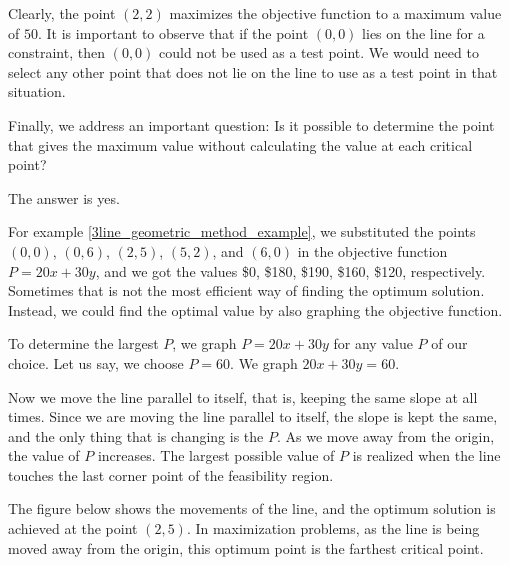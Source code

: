 \begin{solution}
    Clearly, the point $(2, 2)$ maximizes the objective function to a maximum value of $50$. It is important to observe that if the point $(0,0)$ lies on the line for a constraint, then $(0,0)$ could not be used as a test point. We would need to select any other point that does not lie on the line to use as a test point in that situation.
\end{solution}

Finally, we address an important question: Is it possible to determine the point that gives the maximum value without calculating the value at each critical point?

The answer is yes.

For example \ref{3line_geometric_method_example}, we substituted the points $(0, 0)$, $(0, 6)$, $(2, 5)$, $(5, 2)$, and $(6, 0)$ in the objective function $P =  20x + 30y$, and we got the values \$0, \$180, \$190, \$160, \$120, respectively.
Sometimes that is not the most efficient way of finding the optimum solution. Instead, we could find the optimal value by also graphing the objective function.

To determine the largest $P$, we graph $P = 20x + 30y$ for any value $P$ of our choice. Let us say, we choose $P = 60$. We graph $20x + 30y = 60$.

Now we move the line parallel to itself, that is, keeping the same slope at all times. Since we are moving the line parallel to itself, the slope is kept the same, and the only thing that is changing is the $P$. As we move away from the origin, the value of $P$ increases. The largest possible value of $P$ is realized when the line touches the last corner point of the feasibility region.

The figure below shows the movements of the line, and the optimum solution is achieved at the point $(2, 5)$. In maximization problems, as the line is being moved away from the origin, this optimum point is the farthest critical point.

